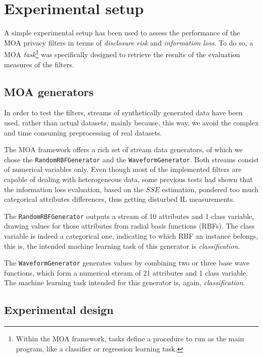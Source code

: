 \section{Experimental setup}
\label{Benchmarking:Experimental}

A simple experimental setup has been used to assess the performance of the MOA privacy filters in terms of \textit{disclosure risk} and \textit{information loss}. To do so, a MOA \textit{task}\footnote{Within the MOA framework, tasks define a procedure to run as the main program, like a classifier or regression learning task.} was specifically designed to retrieve the results of the evaluation measures of the filters.

\subsection{MOA generators}
\label{Benchmarking:Experimental:MOAGenerators}

In order to test the filters, streams of synthetically generated data have been used, rather than actual datasets, mainly because, this way, we avoid the complex and time consuming preprocessing of real datasets.

The MOA framework offers a rich set of stream data generators, of which we chose the \texttt{RandomRBFGenerator} and the \texttt{WaveformGenerator}. Both streams consist of numerical variables only. Even though most of the implemented filters are capable of dealing with heterogeneous data, some previous tests had shown that the information loss evaluation, based on the $SSE$ estimation, pondered too much categorical attributes differences, thus getting disturbed IL measurements.

The \texttt{RandomRBFGenerator} outputs a stream of 10 attributes and 1 class variable, drawing values for those attributes from radial basis functions (RBFs). The class variable is indeed a categorical one, indicating to which RBF an instance belongs, this is, the intended machine learning task of this generator is \textit{classification}.

The \texttt{WaveformGenerator} generates values by combining two or three base wave functions, which form a numerical stream of 21 attributes and 1 class variable. The machine learning task intended for this generator is, again, \textit{classification}.

\subsection{Experimental design}
\label{Benchmarking:Experimental:Design}

